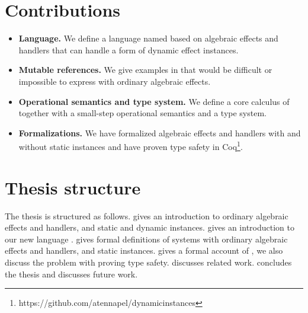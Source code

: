 \section*{Contributions}
\begin{itemize}

\item \textbf{Language.}
We define a language named \lang{} based on algebraic effects and handlers that can handle a form of dynamic effect instances.

\item \textbf{Mutable references.}
We give examples in \lang{} that would be difficult or impossible to express with ordinary algebraic effects.

\item \textbf{Operational semantics and type system.}
We define a core calculus of \lang{} together with a small-step operational semantics and a type system.

\iffalse
\item \textbf{Research on type safety for dynamic instances.}
We show the problems we encountered when trying to prove type safety for \lang{}.
We discuss the other approaches that may allow us to prove type safety.
\fi

\item \textbf{Formalizations.}
We have formalized algebraic effects and handlers with and without static instances and have proven type safety in Coq\footnote{https://github.com/atennapel/dynamicinstances}.

\end{itemize}

\section*{Thesis structure}
The thesis is structured as follows.
 gives an introduction to ordinary algebraic effects and handlers, and static and dynamic instances.
 gives an introduction to our new language \lang{}.
 gives formal definitions of systems with ordinary algebraic effects and handlers, and static instances.
 gives a formal account of \lang{}, we also discuss the problem with proving type safety.
 discusses related work.
 concludes the thesis and discusses future work.
